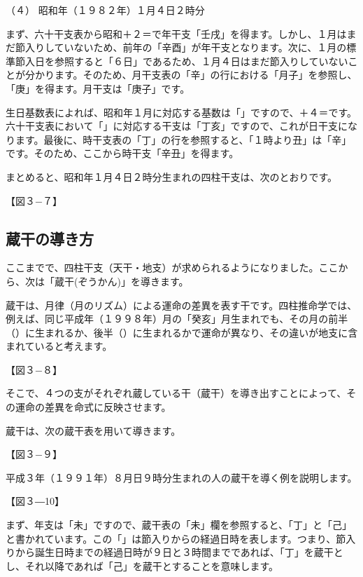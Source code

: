 \documentclass[a5paper,11pt,dvipdfmx]{tarticle}
\begin{document}
（４）	昭和年（１９８２年）１月４日２時分

まず、六十干支表から昭和＋２＝で年干支「壬戌」を得ます。しかし、１月はまだ節入りしていないため、前年の「辛酉」が年干支となります。次に、１月の標準節入日を参照すると「６日」であるため、１月４日はまだ節入りしていないことが分かります。そのため、月干支表の「辛」の行における「月子」を参照し、「庚」を得ます。月干支は「庚子」です。

生日基数表によれば、昭和年１月に対応する基数は「」ですので、＋４＝です。六十干支表において「」に対応する干支は「丁亥」ですので、これが日干支になります。最後に、時干支表の「丁」の行を参照すると、「１時より丑」は「辛」です。そのため、ここから時干支「辛丑」を得ます。

まとめると、昭和年１月４日２時分生まれの四柱干支は、次のとおりです。

【図３−７】

\subsection{蔵干の導き方}
ここまでで、四柱干支（天干・地支）が求められるようになりました。ここから、次は「蔵干(ぞうかん)」を導きます。

蔵干は、月律（月のリズム）による運命の差異を表す干です。四柱推命学では、例えば、同じ平成年（１９９８年）月の「癸亥」月生まれでも、その月の前半（）に生まれるか、後半（）に生まれるかで運命が異なり、その違いが地支に含まれていると考えます。

【図３−８】

そこで、４つの支がそれぞれ蔵している干（蔵干）を導き出すことによって、その運命の差異を命式に反映させます。

蔵干は、次の蔵干表を用いて導きます。

【図３−９】

平成３年（１９９１年）８月日９時分生まれの人の蔵干を導く例を説明します。

【図３―10】

まず、年支は「未」ですので、蔵干表の「未」欄を参照すると、「丁」と「己」と書かれています。この「」は節入りからの経過日時を表します。つまり、節入りから誕生日時までの経過日時が９日と３時間までであれば、「丁」を蔵干とし、それ以降であれば「己」を蔵干とすることを意味します。
\end{document}
